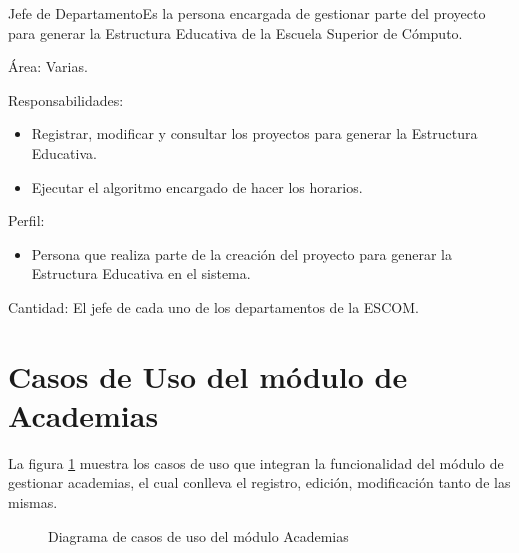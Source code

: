 \begin{actor}{Jefe de Departamento}{Es la persona encargada de gestionar parte del proyecto para generar la Estructura Educativa de la Escuela Superior de Cómputo.}
	
	\item[Área:] Varias.
	\item[Responsabilidades:] \hspace{1pt}
	\begin{itemize}
		\item Registrar, modificar y consultar los proyectos para generar la Estructura Educativa.
		
		\item Ejecutar el algoritmo encargado de hacer los horarios.
		
	\end{itemize}
	\item[Perfil:] \hspace{1pt}
	\begin{itemize}
		\item Persona que realiza parte de la creación del proyecto para generar la Estructura Educativa en el sistema.
	\end{itemize}
	\item[Cantidad:] El jefe de cada uno de los departamentos de la ESCOM.
\end{actor}


\newpage 

\section{Casos de Uso del módulo de Academias}

La figura \ref{fig:casosUso:gestionarAcademias} muestra los casos de uso que integran la funcionalidad del módulo de gestionar academias, el cual conlleva el registro, edición, modificación tanto de las mismas.
\begin{figure}[htpb!]
	\begin{center}
		\caption{Diagrama de casos de uso del módulo Academias \label{fig:casosUso:gestionarAcademias}}
	\end{center}
\end{figure}

